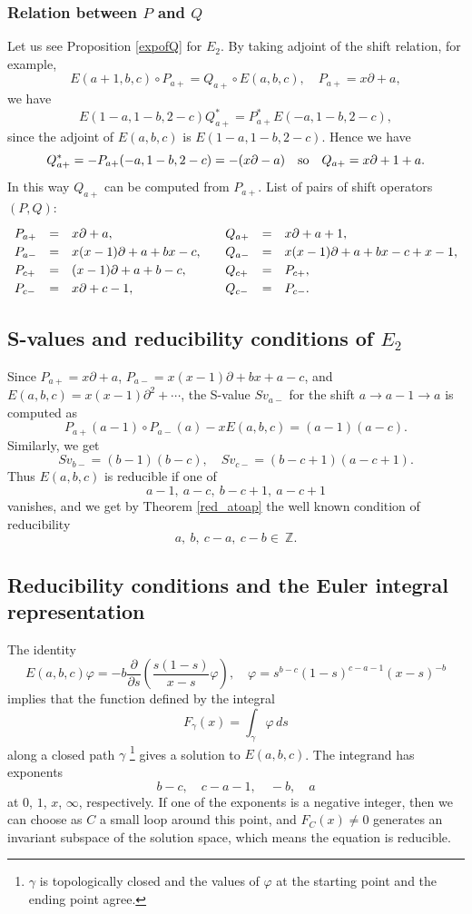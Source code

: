 \documentclass[a4paper,12pt]{article}
\theoremstyle{definition}
\theoremstyle{remark}
\numberwithin{equation}{section} %
\begin{document}
\subsubsection{Relation between $P$ and $Q$}\label{E2ShiftPQ}
Let us see Proposition \ref{expofQ} for $E_2$. By taking adjoint of the shift relation, for example,
 $$ E(a+1,b,c)\circ P_{a+}=Q_{a+}\circ E(a,b,c),\quad P_{a+}=x\partial+a,$$
we have
 $$E(1-a,1-b,2-c)Q_{a+}^*=P_{a+}^*E(-a,1-b,2-c),$$
since the adjoint of $E(a,b,c)$ is $E(1-a,1-b,2-c)$. Hence we have
 $$Q_{a+}^*=-P_{a+}(-a,1-b,2-c)=-(x\partial-a)\quad{\rm so}\quad Q_{a+}=x\partial+1+a.$$ 
In this way $Q_{a+}$ can be computed from $P_{a+}$. List of pairs of shift operators $(P,Q)$:
\[\def\arraystretch{1.2}
\begin{array}{llllll}
P_{a+}&=&x\partial+a,&Q_{a+}&=&x\partial+a+1,\\
P_{a-}&=&x(x-1)\partial+a+bx-c,\quad
&Q_{a-}&=&x(x-1)\partial+a+bx-c+x-1,\\  %
P_{c+}&=&(x-1)\partial+a+b-c,&Q_{c+}&=&P_{c+},\\
P_{c-}&=&x\partial+c-1,&Q_{c-}&=&P_{c-}.
\end{array}
\]


\subsection{S-values and reducibility conditions of $E_2$}\label{E2S}
Since $P_{a+}=x\partial+a$, $P_{a-}=x(x-1)\partial+bx+a-c$, and
$E(a,b,c)=x(x-1)\partial^2+\cdots$,
the S-value $Sv_{a-}$ for the shift $a\to a-1\to a$ is computed as
  $$P_{a+}(a-1)\circ P_{a-}(a)-xE(a,b,c)=(a - 1)(a - c).$$
Similarly, we get
  $$Sv_{b-}=(b-1)(b-c),\quad Sv_{c-}=(b - c + 1)(a - c + 1).$$
Thus $E(a,b,c) $ is reducible if one of 
  $$a-1,\ a-c,\ b-c+1,\ a-c+1 $$
vanishes, and we get by Theorem \ref{red_atoap} 
the well known condition of reducibility
  $$a,\ b,\ c-a,\ c-b \in\ \mathbb{Z}.$$

\subsection{Reducibility conditions and the Euler integral representation}\label{E2Red}
The identity
    $$E(a,b,c)\varphi=-b\frac{\partial}{\partial s}\left(\frac{s(1-s)}{x-s}\varphi\right),\quad \varphi=s^{b-c}(1-s)^{c-a-1}(x-s)^{-b}$$
implies that the function defined by the integral
    $$F_\gamma(x)=\int_\gamma\varphi \, ds$$
along a closed path $\gamma$ \footnote{$\gamma$ is topologically closed and the values of $\varphi$ at the starting point and the ending point agree.}  gives a solution to $E(a,b,c)$.
The integrand has exponents $$b-c,\quad c-a-1,\quad -b, \quad a$$
at $0$, $1$, $x$, $\infty$, respectively.
If one of the exponents is a negative integer,
then we can choose as $C$ a small loop around this point,
and $F_C(x)\not=0$ generates an invariant subspace of the solution space,
which means the equation is reducible.    
\end{document}
